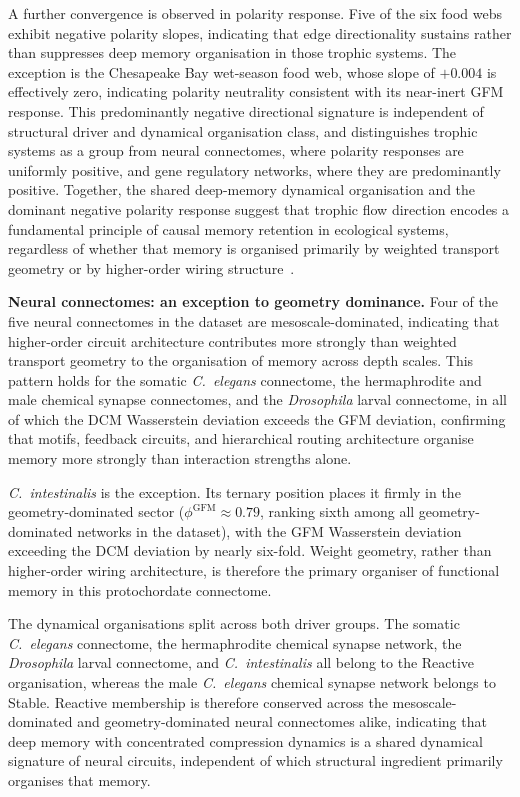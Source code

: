 \documentclass[aps,superscriptaddress,11pt]{revtex4-2}
\theoremstyle{definition}
\theoremstyle{plain}
\begin{document}
A further convergence is observed in polarity response. Five of the six
food webs exhibit negative polarity slopes, indicating that edge
directionality sustains rather than suppresses deep memory organisation
in those trophic systems. The exception is the Chesapeake Bay wet-season
food web, whose slope of $+0.004$ is effectively zero, indicating polarity
neutrality consistent with its near-inert GFM response. This predominantly
negative directional signature is independent of structural driver and
dynamical organisation class, and distinguishes trophic systems as a group
from neural connectomes, where polarity responses are uniformly positive,
and gene regulatory networks, where they are predominantly positive.
Together, the shared deep-memory dynamical organisation and the dominant
negative polarity response suggest that trophic flow direction encodes a
fundamental principle of causal memory retention in ecological systems,
regardless of whether that memory is organised primarily by weighted
transport geometry or by higher-order wiring
structure~\cite{Williams2000,Dunne2002}.


\noindent\textbf{Neural connectomes: an exception to geometry dominance.}
Four of the five neural connectomes in the dataset are mesoscale-dominated,
indicating that higher-order circuit architecture contributes more strongly
than weighted transport geometry to the organisation of memory across depth
scales. This pattern holds for the somatic \textit{C.~elegans}
connectome, the hermaphrodite and male chemical synapse connectomes, and
the \textit{Drosophila} larval connectome, in all of which the DCM
Wasserstein deviation exceeds the GFM deviation, confirming that motifs,
feedback circuits, and hierarchical routing architecture organise memory
more strongly than interaction strengths alone.

\textit{C.~intestinalis} is the exception. Its ternary position places it
firmly in the geometry-dominated sector ($\phi^{\mathrm{GFM}} \approx 0.79$,
ranking sixth among all geometry-dominated networks in the dataset), with
the GFM Wasserstein deviation exceeding the DCM deviation by nearly
six-fold. Weight geometry, rather than higher-order wiring architecture,
is therefore the primary organiser of functional memory in this protochordate
connectome.

The dynamical organisations split across both driver groups. The somatic
\textit{C.~elegans} connectome, the hermaphrodite chemical synapse network,
the \textit{Drosophila} larval connectome, and \textit{C.~intestinalis}
all belong to the Reactive organisation, whereas the male
\textit{C.~elegans} chemical synapse network belongs to Stable.
Reactive membership is therefore conserved across the mesoscale-dominated
and geometry-dominated neural connectomes alike, indicating that deep memory
with concentrated compression dynamics is a shared dynamical signature of
neural circuits, independent of which structural ingredient primarily
organises that memory.
\end{document}
